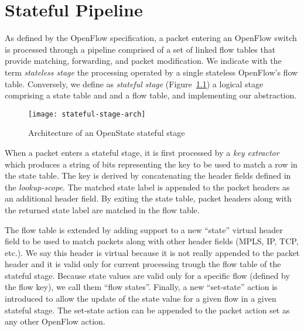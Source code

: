 
\chapter{Stateful Pipeline}

As defined by the OpenFlow specification, a packet entering an OpenFlow switch is processed through a pipeline comprised of a set of linked flow tables that provide matching, forwarding, and packet modification. We indicate with the term \emph{stateless stage} the processing operated by a single stateless OpenFlow's flow table. Conversely, we define as \emph{stateful stage} (Figure~\ref{f:stateful-stage}) a logical stage comprising a state table and and a flow table, and implementing our abstraction.

\begin{figure}[h]
	\centering
	\texttt{[image: stateful-stage-arch]}
	\caption{Architecture of an OpenState stateful stage}
	\label{f:stateful-stage}
\end{figure}

When a packet enters a stateful stage, it is first processed by a \emph{key extractor} which produces a string of bits representing the key to be used to match a row in the state table. The key is derived by concatenating the header fields defined in the \emph{lookup-scope}. The matched state label is appended to the packet headers as an additional header field. By exiting the state table, packet headers along with the returned state label are matched in the flow table.

The flow table is extended by adding support to a new ``state'' virtual header field to be used to match packets along with other header fields (MPLS, IP, TCP, etc.). We say this header is virtual because it is not really appended to the packet header and it is valid only for current processing trough the flow table of the stateful stage. Because state values are valid only for a specific flow (defined by the flow key), we call them ``flow states''. Finally, a new ``set-state'' action is introduced to allow the update of the state value for a given flow in a given stateful stage. The set-state action can be appended to the packet action set as any other OpenFlow action.


